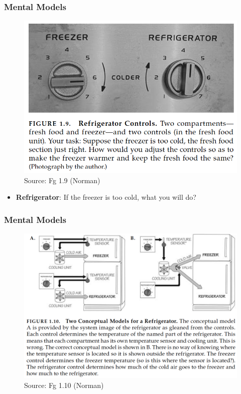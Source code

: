 \documentclass{beamer}
\begin{document}
\begin{frame}
\frametitle{Mental Models}
\centering
\begin{figure}
	\includegraphics[width=0.6\linewidth]{model2}
	\caption{Source: Fg 1.9 (Norman)}
\end{figure}
\vspace{-10pt}
\begin{itemize}
	\item \textbf{Refrigerator}: If the freezer is too cold, what you will do?
\end{itemize}
\end{frame}

\begin{frame}
\frametitle{Mental Models}
\centering
\begin{figure}
	\includegraphics[width=0.7\linewidth]{model3}
	\caption{Source: Fg 1.10 (Norman)}
\end{figure}
\end{frame}

\end{document}
